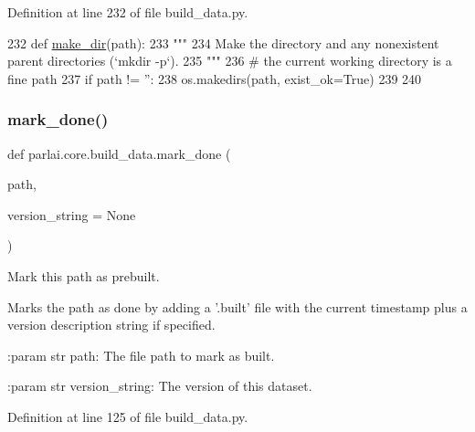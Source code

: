 Definition at line 232 of file build\+\_\+data.\+py.


\begin{DoxyCode}
232 \textcolor{keyword}{def }\hyperlink{namespaceparlai_1_1core_1_1build__data_a6ce042fedd4194bd016845bbe7a8facf}{make\_dir}(path):
233     \textcolor{stringliteral}{"""}
234 \textcolor{stringliteral}{    Make the directory and any nonexistent parent directories (`mkdir -p`).}
235 \textcolor{stringliteral}{    """}
236     \textcolor{comment}{# the current working directory is a fine path}
237     \textcolor{keywordflow}{if} path != \textcolor{stringliteral}{''}:
238         os.makedirs(path, exist\_ok=\textcolor{keyword}{True})
239 
240 
\end{DoxyCode}
\mbox{\label{namespaceparlai_1_1core_1_1build__data_a2527e6d29b0ccb7b841182890ac36a59}} 
\subsubsection{\texorpdfstring{mark\+\_\+done()}{mark\_done()}}
{\footnotesize\ttfamily def parlai.\+core.\+build\+\_\+data.\+mark\+\_\+done (\begin{DoxyParamCaption}\item[{}]{path,  }\item[{}]{version\+\_\+string = {\ttfamily None} }\end{DoxyParamCaption})}

\begin{DoxyVerb}Mark this path as prebuilt.

Marks the path as done by adding a '.built' file with the current timestamp
plus a version description string if specified.

:param str path:
    The file path to mark as built.

:param str version_string:
    The version of this dataset.
\end{DoxyVerb}
 

Definition at line 125 of file build\+\_\+data.\+py.


